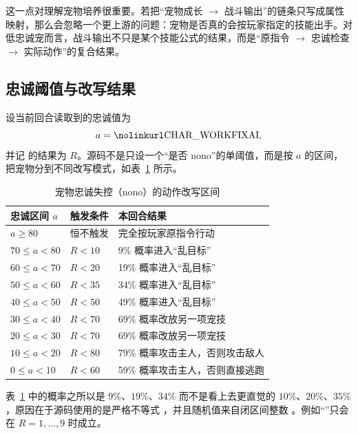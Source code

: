 这一点对理解宠物培养很重要。若把“宠物成长 $\rightarrow$ 战斗输出”的链条只写成属性映射，那么会忽略一个更上游的问题：宠物是否真的会按玩家指定的技能出手。对低忠诚宠而言，战斗输出不只是某个技能公式的结果，而是“原指令 $\rightarrow$ 忠诚检查 $\rightarrow$ 实际动作”的复合结果。

\subsection{忠诚阈值与改写结果}

设当前回合读取到的忠诚值为
\begin{equation}
    a = \code{CHAR\_WORKFIXAI},
\end{equation}
并记  的结果为 $R$。源码不是只设一个“是否 nono”的单阈值，而是按 $a$ 的区间，把宠物分到不同改写模式，如表~\ref{tab:nono-modes} 所示。

\begin{table}[H]
    \centering
    \caption{宠物忠诚失控（nono）的动作改写区间}
    \label{tab:nono-modes}
    \begin{tabularx}{\linewidth}{@{}>{\raggedright\arraybackslash}p{2.5cm} >{\raggedright\arraybackslash}p{2.7cm} X@{}}
        \toprule
        忠诚区间 $a$ & 触发条件 & 本回合结果 \\
        \midrule
        $a \ge 80$ & 恒不触发 & 完全按玩家原指令行动 \\
        $70 \le a < 80$ & $R < 10$ & 9\% 概率进入“乱目标” \\
        $60 \le a < 70$ & $R < 20$ & 19\% 概率进入“乱目标” \\
        $50 \le a < 60$ & $R < 35$ & 34\% 概率进入“乱目标” \\
        $40 \le a < 50$ & $R < 50$ & 49\% 概率进入“乱目标” \\
        $30 \le a < 40$ & $R < 70$ & 69\% 概率改放另一项宠技 \\
        $20 \le a < 30$ & $R < 70$ & 69\% 概率改放另一项宠技 \\
        $10 \le a < 20$ & $R < 80$ & 79\% 概率攻击主人，否则攻击敌人 \\
        $0 \le a < 10$ & $R < 60$ & 59\% 概率攻击主人，否则直接逃跑 \\
        \bottomrule
    \end{tabularx}
\end{table}

表~\ref{tab:nono-modes} 中的概率之所以是 $9\%$、$19\%$、$34\%$ 而不是看上去更直觉的 $10\%$、$20\%$、$35\%$，原因在于源码使用的是严格不等式 \code{<}，并且随机值来自闭区间整数 。例如“”只会在 $R=1,\dots,9$ 时成立。

